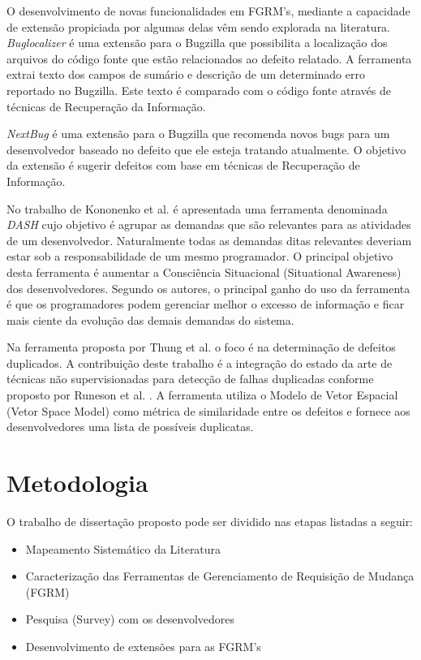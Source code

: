 \documentclass[msc,proposal,hidelot,hideabstract]{ppgccufmg} %
\begin{document}
O desenvolvimento de novas funcionalidades em FGRM's, mediante a capacidade de
extensão propiciada por algumas delas vêm sendo explorada na literatura. \textit{Buglocalizer} \cite{Thung:2014:BIT:2635868.2661678} é uma extensão para o Bugzilla que possibilita a localização dos arquivos do código fonte que estão relacionados ao defeito relatado. A ferramenta extrai texto dos campos de sumário e descrição de um determinado erro reportado no Bugzilla. Este texto é comparado com o código fonte através de técnicas de Recuperação da Informação.

\textit{NextBug} \cite{101186} é uma extensão para o Bugzilla que
recomenda novos bugs para um desenvolvedor baseado no defeito que ele esteja
tratando atualmente. O objetivo da extensão é sugerir defeitos com base em técnicas de
Recuperação de Informação.

No trabalho de Kononenko et al. \cite{Kononenko:2014:DED:2591062.2591075} é
apresentada uma ferramenta denominada \textit{DASH} cujo objetivo é agrupar as
demandas que são relevantes para as atividades de um desenvolvedor. Naturalmente todas as demandas ditas relevantes deveriam estar sob a responsabilidade de um mesmo programador. O principal objetivo desta ferramenta é aumentar a Consciência Situacional (Situational Awareness) dos
desenvolvedores. Segundo os autores, o principal ganho do uso da ferramenta é
que os programadores podem gerenciar melhor o excesso de informação e ficar
mais ciente da evolução das demais demandas do sistema.

Na ferramenta proposta por Thung et al. \cite{Thung:2014:DIT:2642937.2648627} o
foco é na determinação de defeitos duplicados. A contribuição deste trabalho é a
integração do estado da arte de técnicas não supervisionadas para detecção de
falhas duplicadas conforme proposto por Runeson et al. \cite{Runeson:2007:DDD:1248820.1248882}. A ferramenta utiliza o Modelo de Vetor Espacial (Vetor Space Model) como métrica de similaridade entre os defeitos e fornece aos desenvolvedores uma lista de possíveis duplicatas.

\chapter{Metodologia}
\label{ch:metodologia}

O trabalho de dissertação proposto pode ser dividido nas etapas listadas a seguir:


	\begin{itemize}[(i)]
		\item Mapeamento Sistemático da Literatura \cite{keele2007guidelines}
		\item Caracterização das Ferramentas de Gerenciamento de Requisição de Mudança (FGRM)
		\item Pesquisa (Survey) com os desenvolvedores \cite{wohlin2012experimentation}
		\item Desenvolvimento de extensões para as FGRM's
	\end{itemize}
\end{document}
